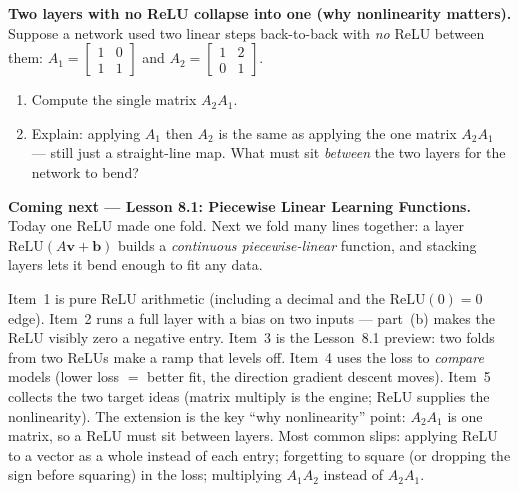\documentclass[10pt]{article}
\newcommand{\vv}{\mathbf{v}}
\newcommand{\bb}{\mathbf{b}}
\newcommand{\relu}{\mathrm{ReLU}}
\begin{document}
\begin{extensionbox}
\textbf{Two layers with no ReLU collapse into one (why nonlinearity matters).} Suppose a network used two
linear steps back-to-back with \emph{no} ReLU between them:
$A_1=\begin{bmatrix} 1 & 0 \\ 1 & 1 \end{bmatrix}$ and $A_2=\begin{bmatrix} 1 & 2 \\ 0 & 1 \end{bmatrix}$.
\begin{enumerate}[label=(\alph*), leftmargin=1.8em, itemsep=5pt]
  \item Compute the single matrix $A_2A_1$.
  \item Explain: applying $A_1$ then $A_2$ is the same as applying the one matrix $A_2A_1$ --- still just a
        straight-line map. What must sit \emph{between} the two layers for the network to bend?
\end{enumerate}
\end{extensionbox}

\begin{spiralbox}
\textbf{Coming next --- Lesson 8.1: Piecewise Linear Learning Functions.} Today one ReLU made one fold.
Next we fold many lines together: a layer $\relu(A\vv+\bb)$ builds a \emph{continuous piecewise-linear}
function, and stacking layers lets it bend enough to fit any data.
\end{spiralbox}

\begin{teachernote}
Item~1 is pure ReLU arithmetic (including a decimal and the $\relu(0)=0$ edge). Item~2 runs a full layer
with a bias on two inputs --- part~(b) makes the ReLU visibly zero a negative entry. Item~3 is the
Lesson~8.1 preview: two folds from two ReLUs make a ramp that levels off. Item~4 uses the loss to
\emph{compare} models (lower loss $=$ better fit, the direction gradient descent moves). Item~5 collects
the two target ideas (matrix multiply is the engine; ReLU supplies the nonlinearity). The extension is the
key ``why nonlinearity'' point: $A_2A_1$ is one matrix, so a ReLU must sit between layers. Most common
slips: applying ReLU to a vector as a whole instead of each entry; forgetting to square (or dropping the
sign before squaring) in the loss; multiplying $A_1A_2$ instead of $A_2A_1$.
\end{teachernote}
\end{document}
